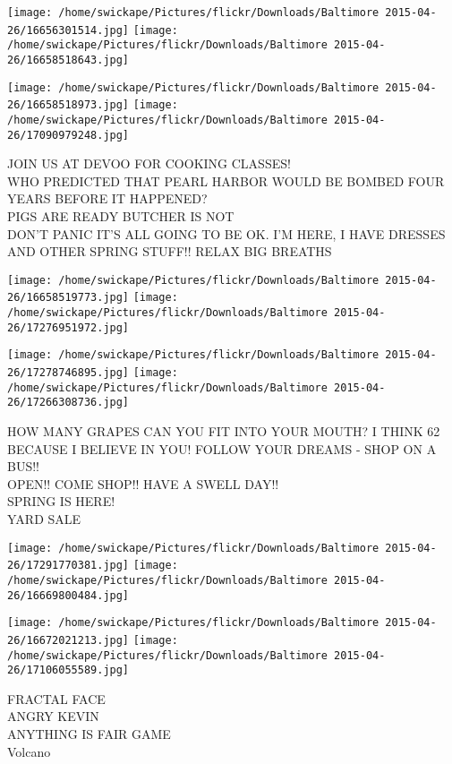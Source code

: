 \documentclass[10pt,letterpaper]{article}
\begin{document}
\texttt{[image: /home/swickape/Pictures/flickr/Downloads/Baltimore 2015-04-26/16656301514.jpg]}
\texttt{[image: /home/swickape/Pictures/flickr/Downloads/Baltimore 2015-04-26/16658518643.jpg]}

\texttt{[image: /home/swickape/Pictures/flickr/Downloads/Baltimore 2015-04-26/16658518973.jpg]}
\texttt{[image: /home/swickape/Pictures/flickr/Downloads/Baltimore 2015-04-26/17090979248.jpg]}

JOIN US AT DEVOO FOR COOKING CLASSES!\\
WHO PREDICTED THAT PEARL HARBOR WOULD BE BOMBED FOUR YEARS BEFORE IT HAPPENED?\\
PIGS ARE READY BUTCHER IS NOT\\
DON'T PANIC IT'S ALL GOING TO BE OK.  I'M HERE, I HAVE DRESSES AND OTHER SPRING STUFF!!  RELAX BIG BREATHS\\
\pagebreak

\texttt{[image: /home/swickape/Pictures/flickr/Downloads/Baltimore 2015-04-26/16658519773.jpg]}
\texttt{[image: /home/swickape/Pictures/flickr/Downloads/Baltimore 2015-04-26/17276951972.jpg]}

\texttt{[image: /home/swickape/Pictures/flickr/Downloads/Baltimore 2015-04-26/17278746895.jpg]}
\texttt{[image: /home/swickape/Pictures/flickr/Downloads/Baltimore 2015-04-26/17266308736.jpg]}

HOW MANY GRAPES CAN YOU FIT INTO YOUR MOUTH?  I THINK 62 BECAUSE I BELIEVE IN YOU!  FOLLOW YOUR DREAMS {-} SHOP ON A BUS!!\\
OPEN!! COME SHOP!! HAVE A SWELL DAY!!\\
SPRING IS HERE!\\
YARD SALE\\
\pagebreak

\texttt{[image: /home/swickape/Pictures/flickr/Downloads/Baltimore 2015-04-26/17291770381.jpg]}
\texttt{[image: /home/swickape/Pictures/flickr/Downloads/Baltimore 2015-04-26/16669800484.jpg]}

\texttt{[image: /home/swickape/Pictures/flickr/Downloads/Baltimore 2015-04-26/16672021213.jpg]}
\texttt{[image: /home/swickape/Pictures/flickr/Downloads/Baltimore 2015-04-26/17106055589.jpg]}

FRACTAL FACE\\
ANGRY KEVIN\\
ANYTHING IS FAIR GAME\\
Volcano\\
\pagebreak
\end{document}
